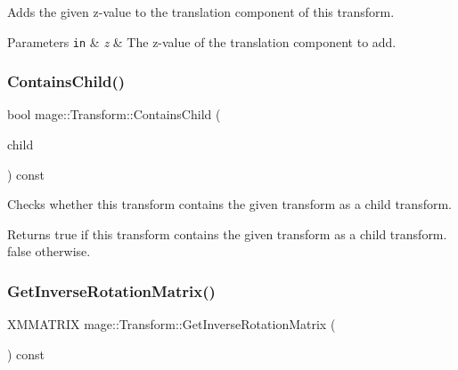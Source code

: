 Adds the given z-\/value to the translation component of this transform.


\begin{DoxyParams}[1]{Parameters}
\mbox{\tt in}  & {\em z} & The z-\/value of the translation component to add. \\
\hline
\end{DoxyParams}
\hypertarget{structmage_1_1_transform_a5a37f49cfb1f631ee580f368f8f84d87}{}\label{structmage_1_1_transform_a5a37f49cfb1f631ee580f368f8f84d87} 
\subsubsection{\texorpdfstring{Contains\+Child()}{ContainsChild()}}
{\footnotesize\ttfamily bool mage\+::\+Transform\+::\+Contains\+Child (\begin{DoxyParamCaption}\item[{const \hyperlink{namespacemage_a1e01ae66713838a7a67d30e44c67703e}{Shared\+Ptr}$<$ \hyperlink{structmage_1_1_transform}{Transform} $>$}]{child }\end{DoxyParamCaption}) const}

Checks whether this transform contains the given transform as a child transform.

\begin{DoxyReturn}{Returns}
{\ttfamily true} if this transform contains the given transform as a child transform. {\ttfamily false} otherwise. 
\end{DoxyReturn}
\hypertarget{structmage_1_1_transform_a12e7ee212a9270fb3f01de9b7f5ee3b8}{}\label{structmage_1_1_transform_a12e7ee212a9270fb3f01de9b7f5ee3b8} 
\subsubsection{\texorpdfstring{Get\+Inverse\+Rotation\+Matrix()}{GetInverseRotationMatrix()}}
{\footnotesize\ttfamily X\+M\+M\+A\+T\+R\+IX mage\+::\+Transform\+::\+Get\+Inverse\+Rotation\+Matrix (\begin{DoxyParamCaption}{ }\end{DoxyParamCaption}) const\hspace{0.3cm}{\ttfamily [private]}}

